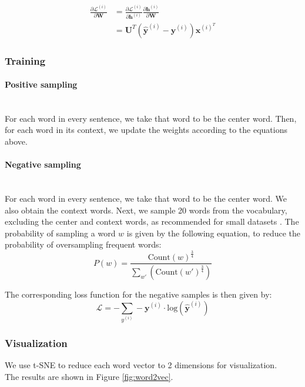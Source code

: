 \documentclass{article}
\numberwithin{equation}{section}
\begin{document}
\begin{equation}
\begin{split}
\frac{\partial \mathcal{L}^{(i)}}{\partial \bm{W}}
	&= \frac{\partial \mathcal{L}^{(i)}}{\partial \bm{h}^{(i)}} \frac{\partial \bm{h}^{(i)}}{\partial \bm{W}} \\
	&= \bm{U}^T(\hat{\bm{y}}^{(i)} - \bm{y}^{(i)}) \bm{x}^{(i)^T}
\end{split}
\end{equation}

\subsubsection{Training}
\paragraph{Positive sampling}\mbox{}\\
For each word in every sentence, we take that word to be the center word. Then, for each word in its context, we update the weights according to the equations above.

\paragraph{Negative sampling}\mbox{}\\
For each word in every sentence, we take that word to be the center word. We also obtain the context words. Next, we sample 20 words from the vocabulary, excluding the center and context words, as recommended for small datasets \cite{DBLP:journals/corr/MikolovSCCD13}. The probability of sampling a word $w$ is given by the following equation, to reduce the probability of oversampling frequent words:
	$$ P(w) = \frac{\text{Count}(w)^\frac{3}{4}}{\sum_{w'}(\text{Count}(w')^\frac{3}{4})}  $$

The corresponding loss function for the negative samples is then given by:
	$$ \mathcal{L} = -\sum_{y^{(i)}} -\bm{y}^{(i)} \cdot \text{log}(\hat{\bm{y}}^{(i)}) $$

\subsubsection{Visualization}
We use t-SNE to reduce each word vector to 2 dimensions for visualization.\\
The results are shown in Figure \ref{fig:word2vec}.
\end{document}

